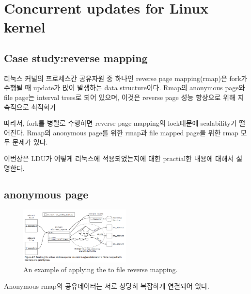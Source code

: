\section{Concurrent updates for Linux kernel}

\subsection{Case study:reverse mapping}

리눅스 커널의 프로세스간 공유자원 중 하나인 reverse page mapping(rmap)은 fork가 수행될 때 update가 많이 발생하는
data structure이다.
Rmap의 anonymous page와 file page는 interval trees로 되어 있으며, 이것은 reverse page 성능
향상으로 위해 지속적으로 최적화가 ~\cite{CorbetLWNRMAP}~\cite{CorbetLWNANON}


따라서, fork를 병렬로 수행하면 reverse page mapping의 lock떄문에 scalability가 떨어진다.
Rmap의 anonymous page를 위한 rmap과 file mapped page을 위한 rmap 모두 문제가 있다. 


이번장은 LDU가 어떻게 리눅스에 적용되었는지에 대한 practial한 내용에 대해서 설명한다.

\subsection{anonymous page}

\begin{figure}[tb]
  \begin{center}
     \includegraphics[width=0.5\textwidth,height=0.5\textheight,keepaspectratio]{fig/anon_vma_sample}
  \end{center}
  \caption{An example of applying the  to file reverse mapping. }
  \label{fig:deferu2}
\end{figure}


Anonymous rmap의 공유데이터는 서로 상당히 복잡하게 연결되어 있다.


